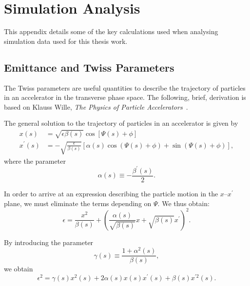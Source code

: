 %
%

\chapter{Simulation Analysis}
\label{Apx:SA}

This appendix details some of the key calculations used when analysing simulation data used for this thesis work.

\section{Emittance and Twiss Parameters}
\label{Apx:SA:EnTwiss}

The Twiss parameters are useful quantities to describe the trajectory of particles in an accelerator in the transverse phase space.
The following, brief, derivation is based on Klauss Wille, \textit{The Physics of Particle Accelerators}~\cite{wille:2001}.

The general solution to the trajectory of particles in an accelerator is given by
\begin{align}
    x(s)          &=  \sqrt{\epsilon\beta(s)} \cos\left[\Psi(s) + \phi\right] \label{EQ:PTrajX} \\
    x^{\prime}(s) &= -\sqrt{\frac{\epsilon}{\beta(s)}}
                     \left[\alpha(s)\cos\left(\Psi(s) + \phi\right) + \sin\left(\Psi(s) + \phi\right)\right], \label{EQ:PTrajXP}
\end{align}
where the parameter
\begin{equation}
    \alpha(s) \equiv -\frac{\beta^{\prime}(s)}{2}. \label{EQ:TwissAlpha}
\end{equation}

In order to arrive at an expression describing the particle motion in the $x$--$x^\prime$ plane, we must eliminate the terms depending on $\Psi$.
We thus obtain:
\begin{equation}
    \epsilon = \frac{x^2}{\beta(s)} + \left(\frac{\alpha(s)}{\sqrt{\beta(s)}}x + \sqrt{\beta(s)}x^{\prime}\right)^2.
\end{equation}

By introducing the parameter
\begin{equation}
    \gamma(s) \equiv \frac{1+\alpha^2(s)}{\beta(s)}, \label{EQ:TwissGamma}
\end{equation}
we obtain
\begin{equation}
    \epsilon^2 = \gamma(s)x^2(s) + 2\alpha(s)x(s)x^{\prime}(s) + \beta(s)x^{\prime 2}(s). \label{EQ:EmittFull}
\end{equation}

